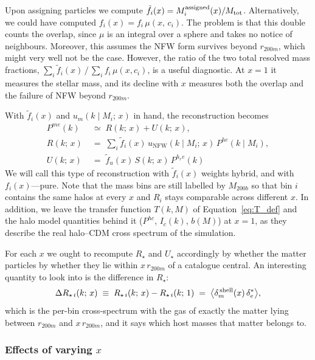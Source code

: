 \documentclass{article}
\begin{document}
Upon assigning particles we compute $\tilde f_i(x) = M_i^{\rm assigned}(x)/M_{\rm tot}$. Alternatively, we could have computed $f_i(x) = f_i \,\mu (x, \, c_i)$. The problem is that this double counts the overlap, since $\mu$ is an integral over a sphere and takes
no notice of neighbours. Moreover, this assumes the NFW form survives beyond
$r_{200m}$, which might very well not be the case. However, the ratio of the two total resolved mass fractions, ${\sum_i \tilde f_i(x)}\,/\,{\sum_i f_i\,\mu(x,c_i)}$, is a useful diagnostic.
At $x=1$ it measures the stellar
mass, and its decline with
$x$ measures both the overlap and the failure of NFW beyond $r_{200m}$.
 
With $\tilde f_i(x)$ and $u_m(k\mid M_i;\,x)$ in hand, the reconstruction becomes
\begin{equation}
\begin{aligned} \label{eq:B-RU}
    P^{me}(k) &\;\simeq\; R(k;\,x) + U(k;\,x),\\[1ex]
    R(k;\,x) &\;=\; \sum_i \tilde f_i(x)\, u_\mathrm{NFW}(k \mid M_i;\,x)\, P^{he}(k \mid M_i), \\
    U(k;\,x) &\;=\; \tilde f_u(x)\, S(k;\,x)\, P^{h_re}(k)
\end{aligned}
\end{equation}
We will call this type of reconstruction with $\tilde f_i (x)$ weights hybrid, and with $f_i(x)$---pure.
Note that the mass bins are still labelled by
$M_{200b}$ so that bin $i$ contains the same halos at every $x$ and $R_i$
stays comparable across different $x$. In addition, we leave the transfer function $T(k,M)$ of Equation~\eqref{eq:T_def} and the halo model quantities behind it ($P^{hc}$, $I_c(k)$, $b(M)$) at $x=1$, as they describe the real halo--CDM cross spectrum of the
simulation.

For each $x$ we ought to recompute $R_\star$ and $U_\star$ accordingly by whether the matter particles by whether they lie within
$x\,r_{200m}$ of a catalogue central. An interesting quantity to look into is the difference in $R_\star$:
\begin{equation}
  \Delta R_{\star \, i}(k;\,x) \;\equiv\; R_{\star \, i}(k;\,x)-R_{\star \, i}(k;\,1)
  \;=\;\big\langle \delta_m^{\rm \,shell}(x)\,\delta_e^*\big\rangle,
  \label{eq:B-shell}
\end{equation}
which is the per-bin cross-spectrum with the gas of exactly the matter lying between $r_{200m}$
and $x\,r_{200m}$, and it says
which host masses that matter belongs to.

\subsubsection{Effects of varying $x$}
 
\end{document}
